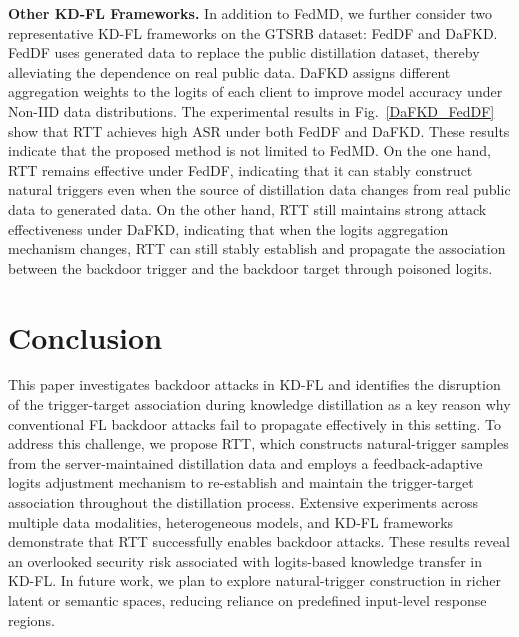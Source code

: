 \documentclass[lettersize,journal]{IEEEtran}
\begin{document}
\textbf{Other KD-FL Frameworks.}
In addition to FedMD, we further consider two representative KD-FL frameworks on the GTSRB dataset: FedDF and DaFKD.
FedDF uses generated data to replace the public distillation dataset, thereby alleviating the dependence on real public data.
DaFKD assigns different aggregation weights to the logits of each client to improve model accuracy under Non-IID data distributions.
The experimental results in Fig.~\ref{DaFKD_FedDF} show that RTT achieves high ASR under both FedDF and DaFKD. These results indicate that the proposed method is not limited to FedMD.
On the one hand, RTT remains effective under FedDF, indicating that it can stably construct natural triggers even when the source of distillation data changes from real public data to generated data.
On the other hand, RTT still maintains strong attack effectiveness under DaFKD, indicating that when the logits aggregation mechanism changes, RTT can still stably establish and propagate the association between the backdoor trigger and the backdoor target through poisoned logits.


\section{Conclusion}
This paper investigates backdoor attacks in KD-FL and identifies the disruption of the trigger-target association during knowledge distillation as a key reason why conventional FL backdoor attacks fail to propagate effectively in this setting.
To address this challenge, we propose RTT, which constructs natural-trigger samples from the server-maintained distillation data and employs a feedback-adaptive logits adjustment mechanism to re-establish and maintain the trigger-target association throughout the distillation process.
Extensive experiments across multiple data modalities, heterogeneous models, and KD-FL frameworks demonstrate that RTT successfully enables backdoor attacks.
These results reveal an overlooked security risk associated with logits-based knowledge transfer in KD-FL.
In future work, we plan to explore natural-trigger construction in richer latent or semantic spaces, reducing reliance on predefined input-level response regions.






 
\end{document}
